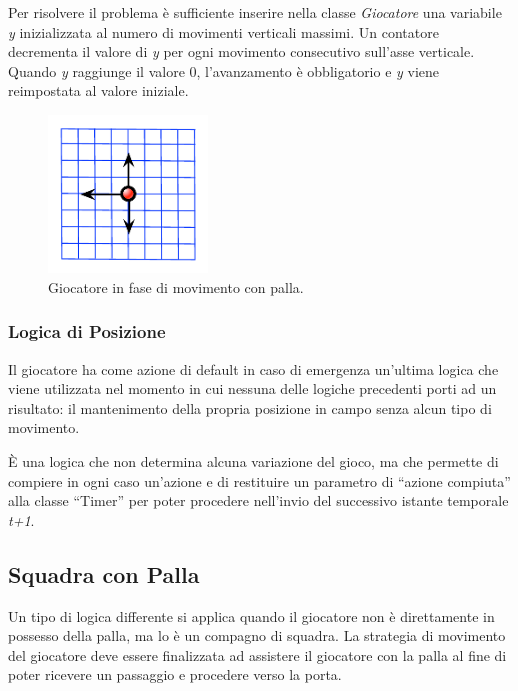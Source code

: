 \documentclass[aps,letterpaper,10pt]{article}
\begin{document}
Per risolvere il problema \`e sufficiente inserire nella classe \emph{Giocatore} una variabile \emph{y} inizializzata al numero di movimenti verticali massimi. Un contatore decrementa il valore di \emph{y} per ogni movimento consecutivo sull'asse verticale. Quando \emph{y} raggiunge il valore 0, l'avanzamento \`e obbligatorio e \emph{y} viene reimpostata al valore iniziale.

\begin{figure}[H]
	\begin{center}
		\includegraphics[width=160px]{images/vision4.pdf}
	\end{center}
\caption{Giocatore in fase di movimento con palla.}
\end{figure}

\subsubsection{Logica di Posizione}
\label{posizione}

Il giocatore ha come azione di default in caso di emergenza un'ultima logica che viene utilizzata nel momento in cui nessuna delle logiche precedenti porti ad un risultato: il mantenimento della propria posizione in campo senza alcun tipo di movimento. \vspace{3mm}

\`E una logica che non determina alcuna variazione del gioco, ma che permette di compiere in ogni caso un'azione e di restituire un parametro di ``azione compiuta'' alla classe ``Timer'' per poter procedere nell'invio del successivo istante temporale \emph{t+1}.

\subsection{Squadra con Palla}

Un tipo di logica differente si applica quando il giocatore non \`e direttamente in possesso della palla, ma lo \`e un compagno di squadra. La strategia di movimento del giocatore deve essere finalizzata ad assistere il giocatore con la palla al fine di poter ricevere un passaggio e procedere verso la porta.
\end{document}
